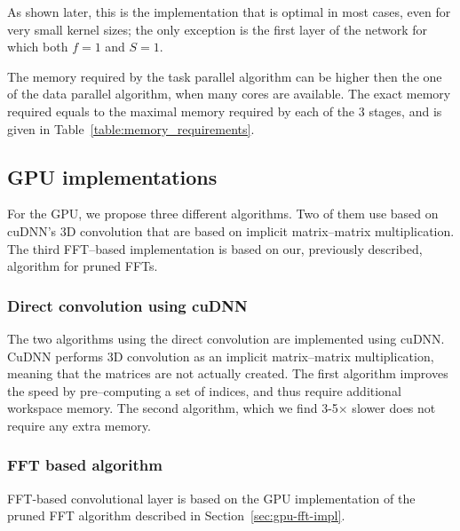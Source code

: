 \documentclass[conference]{./IEEEtran/IEEEtran}
\begin{document}
  As shown later, this is the implementation that is optimal in most
  cases, even for very small kernel sizes; the only exception is the
  first layer of the network for which both $f = 1$ and $S = 1$.

  The memory required by the task parallel algorithm can be higher
  then the one of the data parallel algorithm, when many cores are
  available.  The exact memory required equals to the maximal memory
  required by each of the 3 stages, and is given in
  Table~\ref{table:memory_requirements}.


\subsection{GPU implementations}

  For the GPU, we propose three different algorithms.  Two of them use
  based on cuDNN's 3D convolution that are based on implicit
  matrix--matrix multiplication.  The third FFT--based implementation
  is based on our, previously described, algorithm for pruned
  FFTs.

\subsubsection{Direct convolution using cuDNN}

  The two algorithms using the direct convolution are implemented
  using cuDNN.  CuDNN performs 3D convolution as an implicit
  matrix--matrix multiplication, meaning that the matrices are not
  actually created.  The first algorithm improves the speed by
  pre--computing a set of indices, and thus require additional
  workspace memory.  The second algorithm, which we find 3-5$\times$
  slower does not require any extra memory.

\subsubsection{FFT based algorithm}

  FFT-based convolutional layer is based on the GPU implementation of
  the pruned FFT algorithm described in
  Section~\ref{sec:gpu-fft-impl}.
\end{document}
